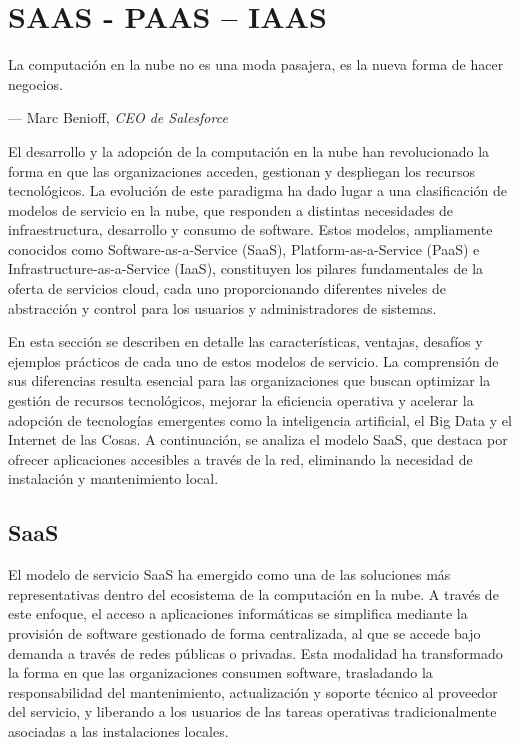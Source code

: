 {\justifying
	\chapter{SAAS - PAAS – IAAS}
	\epigraph{La computación en la nube no es una moda pasajera, es la nueva forma de hacer negocios.}{--- \textup{Marc Benioff, \textit{CEO de Salesforce}}}
    El desarrollo y la adopción de la computación en la nube han revolucionado la forma en que las organizaciones acceden, gestionan y despliegan los recursos tecnológicos. La evolución de este paradigma ha dado lugar a una clasificación de modelos de servicio en la nube, que responden a distintas necesidades de infraestructura, desarrollo y consumo de software. Estos modelos, ampliamente conocidos como Software-as-a-Service (SaaS), Platform-as-a-Service (PaaS) e Infrastructure-as-a-Service (IaaS), constituyen los pilares fundamentales de la oferta de servicios cloud, cada uno proporcionando diferentes niveles de abstracción y control para los usuarios y administradores de sistemas.

    En esta sección se describen en detalle las características, ventajas, desafíos y ejemplos prácticos de cada uno de estos modelos de servicio. La comprensión de sus diferencias resulta esencial para las organizaciones que buscan optimizar la gestión de recursos tecnológicos, mejorar la eficiencia operativa y acelerar la adopción de tecnologías emergentes como la inteligencia artificial, el Big Data y el Internet de las Cosas. A continuación, se analiza el modelo SaaS, que destaca por ofrecer aplicaciones accesibles a través de la red, eliminando la necesidad de instalación y mantenimiento local.
    
    \section{SaaS}
        El modelo de servicio SaaS ha emergido como una de las soluciones más representativas dentro del ecosistema de la computación en la nube. A través de este enfoque, el acceso a aplicaciones informáticas se simplifica mediante la provisión de software gestionado de forma centralizada, al que se accede bajo demanda a través de redes públicas o privadas. Esta modalidad ha transformado la forma en que las organizaciones consumen software, trasladando la responsabilidad del mantenimiento, actualización y soporte técnico al proveedor del servicio, y liberando a los usuarios de las tareas operativas tradicionalmente asociadas a las instalaciones locales.

}
